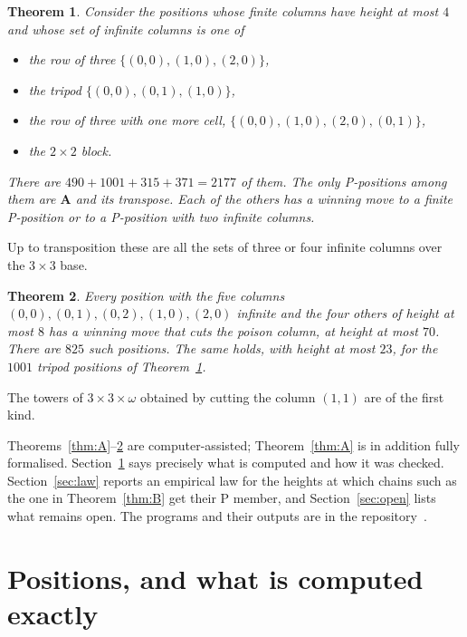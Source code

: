 \documentclass[11pt]{amsart}
\newtheorem{theorem}{Theorem}
\theoremstyle{definition}
\theoremstyle{remark}
\newcommand{\PA}{\mathbf{A}}
\begin{document}
\begin{theorem}\label{thm:class}
Consider the positions whose finite columns have height at most $4$ and whose set of
infinite columns is one of
\begin{itemize}
\item the row of three $\{(0,0),(1,0),(2,0)\}$,
\item the tripod $\{(0,0),(0,1),(1,0)\}$,
\item the row of three with one more cell, $\{(0,0),(1,0),(2,0),(0,1)\}$,
\item the $2\times2$ block.
\end{itemize}
There are $490+1001+315+371=2177$ of them. The only P-positions among them are $\PA$
and its transpose. Each of the others has a winning move to a finite P-position or to a
P-position with two infinite columns.
\end{theorem}

Up to transposition these are all the sets of three or four infinite columns over the
$3\times3$ base.

\begin{theorem}\label{thm:cross}
Every position with the five columns $(0,0),(0,1),(0,2),(1,0),(2,0)$ infinite and the four
others of height at most $8$ has a winning move that cuts the poison column, at height at
most $70$. There are $825$ such positions. The same holds, with height at most $23$, for the
$1001$ tripod positions of Theorem~\ref{thm:class}.
\end{theorem}

The towers of $3\times3\times\omega$ obtained by cutting the column $(1,1)$ are of the first
kind.

Theorems~\ref{thm:A}--\ref{thm:cross} are computer-assisted; Theorem~\ref{thm:A} is in
addition fully formalised. Section~\ref{sec:exact} says precisely what is computed and how it
was checked. Section~\ref{sec:law} reports an empirical
law for the heights at which chains such as the one in Theorem~\ref{thm:B} get their P member,
and Section~\ref{sec:open} lists what remains open. The programs and their outputs are in the
repository~\cite{repo}.

\section{Positions, and what is computed exactly}\label{sec:exact}
\end{document}
